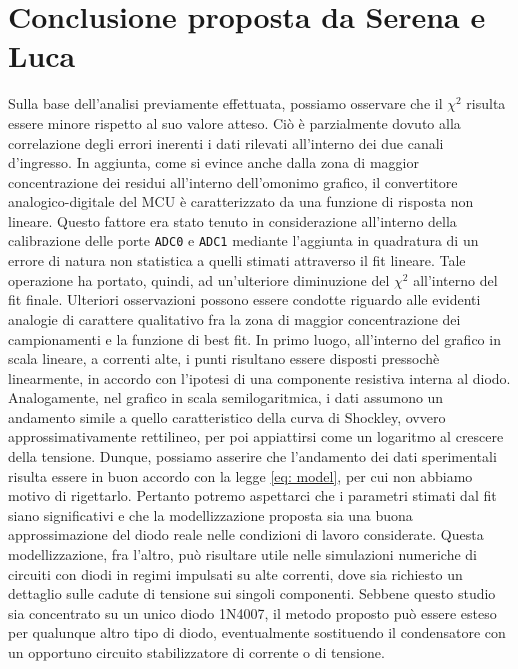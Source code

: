 \documentclass{article}[a4paper, oneside, 11pt]
\begin{document}
\section{Conclusione proposta da Serena e Luca}
Sulla base dell'analisi previamente effettuata, possiamo osservare che il
$\chi^2$ risulta essere minore rispetto al suo valore atteso. Ciò \`e
parzialmente dovuto alla correlazione degli errori inerenti i dati rilevati
all'interno dei due canali d'ingresso. In aggiunta, come si evince anche dalla
zona di maggior concentrazione dei residui all'interno dell'omonimo grafico,
il convertitore analogico-digitale del MCU \`e caratterizzato da una funzione
di risposta non lineare. Questo fattore era stato tenuto in considerazione
all'interno della calibrazione delle porte \verb+ADC0+ e \verb+ADC1+ mediante
l'aggiunta in quadratura di un errore di natura non statistica a quelli stimati
attraverso il fit lineare. Tale operazione ha portato, quindi, ad
un'ulteriore diminuzione del $\chi^2$ all'interno del fit finale.
Ulteriori osservazioni possono essere condotte riguardo alle evidenti analogie
di carattere qualitativo fra la zona di maggior concentrazione dei
campionamenti e la funzione di best fit.
In primo luogo, all'interno del grafico in scala lineare, a correnti alte,
i punti risultano essere disposti pressoch\`e linearmente, in accordo con
l'ipotesi di una componente resistiva interna al diodo. Analogamente, nel
grafico in scala semilogaritmica, i dati assumono un andamento simile a quello
caratteristico della curva di Shockley, ovvero approssimativamente
rettilineo, per poi appiattirsi come un logaritmo al crescere della tensione.
Dunque, possiamo asserire che l'andamento dei dati sperimentali risulta essere
in buon accordo con la legge \eqref{eq: model}, per cui non abbiamo motivo di rigettarlo.
Pertanto potremo aspettarci che i parametri stimati dal fit siano significativi 
e che la modellizzazione proposta sia una buona approssimazione del diodo reale 
nelle condizioni di lavoro considerate. Questa modellizzazione, fra l'altro, 
può risultare utile nelle simulazioni numeriche di circuiti con diodi in regimi
impulsati su alte correnti, dove sia richiesto un dettaglio
sulle cadute di tensione sui singoli componenti. 
Sebbene questo studio sia concentrato su un unico diodo 1N4007, il metodo
proposto pu\`o essere esteso per qualunque altro tipo di diodo, eventualmente
sostituendo il condensatore con un opportuno circuito stabilizzatore di
corrente o di tensione.
\end{document}
